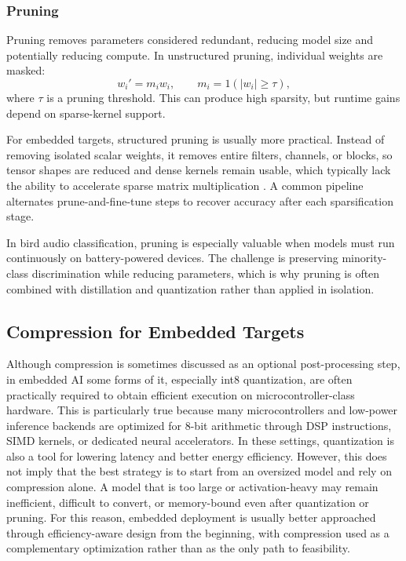 \documentclass[a4paper,singleside,12pt]{report} %
\begin{document}
	\subsubsection{Pruning}
	Pruning removes parameters considered redundant, reducing model size and potentially reducing compute. In unstructured pruning, individual weights are masked:
	\begin{equation}
		w_i' = m_i w_i,\qquad
		m_i = 1\!\left(|w_i| \ge \tau\right),
	\end{equation}
	where \(\tau\) is a pruning threshold. This can produce high sparsity, but runtime gains depend on sparse-kernel support.

	For embedded targets, structured pruning is usually more practical. Instead of removing isolated scalar weights, it removes entire filters, channels, or blocks, so tensor shapes are reduced and dense kernels remain usable, which typically lack the ability to accelerate sparse matrix multiplication \cite{li2019pruning}. A common pipeline alternates prune-and-fine-tune steps to recover accuracy after each sparsification stage.

	In bird audio classification, pruning is especially valuable when models must run continuously on battery-powered devices. The challenge is preserving minority-class discrimination while reducing parameters, which is why pruning is often combined with distillation and quantization rather than applied in isolation.
	\subsection{Compression for Embedded Targets}
	Although compression is sometimes discussed as an optional post-processing step, in embedded AI some forms of it, especially int8 quantization, are often practically required to obtain efficient execution on microcontroller-class hardware. This is particularly true because many microcontrollers and low-power inference backends are optimized for 8-bit arithmetic through DSP instructions, SIMD kernels, or dedicated neural accelerators. In these settings, quantization is also a tool for lowering latency and better energy efficiency. However, this does not imply that the best strategy is to start from an oversized model and rely on compression alone. A model that is too large or activation-heavy may remain inefficient, difficult to convert, or memory-bound even after quantization or pruning. For this reason, embedded deployment is usually better approached through efficiency-aware design from the beginning, with compression used as a complementary optimization rather than as the only path to feasibility.
\end{document}
